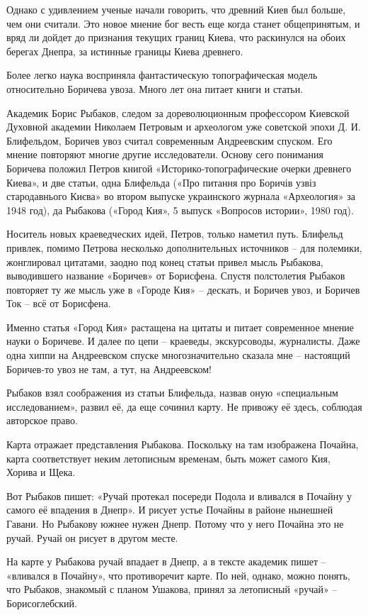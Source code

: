 Однако с удивлением ученые начали говорить, что древний Киев был больше, чем они считали. Это новое мнение бог весть еще когда станет общепринятым, и вряд ли дойдет до признания текущих границ Киева, что раскинулся на обоих берегах Днепра, за истинные границы Киева древнего.

Более легко наука восприняла фантастическую топографическая модель относительно Боричева увоза. Много лет она питает книги и статьи.

Академик Борис Рыбаков, следом за дореволюционным профессором Киевской Духовной академии Николаем Петровым и археологом уже советской эпохи Д. И. Блифельдом, Боричев увоз считал современным Андреевским спуском. Его мнение повторяют многие другие исследователи. Основу сего понимания Боричева положил Петров книгой «Историко-топографические очерки древнего Киева», и две статьи, одна Блифельда («Про питання про Боричів узвіз стародавнього Києва» во втором выпуске украинского журнала «Археология» за 1948 год), да Рыбакова («Город Кия», 5 выпуск «Вопросов истории», 1980 год).

Носитель новых краеведческих идей, Петров, только наметил путь. Блифельд привлек, помимо Петрова несколько дополнительных источников – для полемики, жонглировал цитатами, заодно под конец статьи привел мысль Рыбакова, выводившего название «Боричев» от Борисфена. Спустя полстолетия Рыбаков повторяет ту же мысль уже в «Городе Кия» – дескать, и Боричев увоз, и Боричев Ток – всё от Борисфена.

Именно статья «Город Кия» растащена на цитаты и питает современное мнение науки о Боричеве. И далее по цепи – краеведы, экскурсоводы, журналисты. Даже одна хиппи на Андреевском спуске многозначительно сказала мне – настоящий Боричев-то увоз не там, а тут, на Андреевском!

Рыбаков взял соображения из статьи Блифельда, назвав оную «специальным исследованием», развил её, да еще сочинил карту. Не привожу её здесь, соблюдая авторское право.

Карта отражает представления Рыбакова. Поскольку на там изображена Почайна, карта соответствует неким летописным временам, быть может самого Кия, Хорива и Щека.

Вот Рыбаков пишет: «Ручай протекал посереди Подола и вливался в Почайну у самого её впадения в Днепр». И рисует устье Почайны в районе нынешней Гавани. Но Рыбакову южнее нужен Днепр. Потому что у него Почайна это не ручай. Ручай он рисует в другом месте.

На карте у Рыбакова ручай впадает в Днепр, а в тексте академик пишет – «вливался в Почайну», что противоречит карте. По ней, однако, можно понять, что Рыбаков, знакомый с планом Ушакова, принял за летописный «ручай» – Борисоглебский. 

